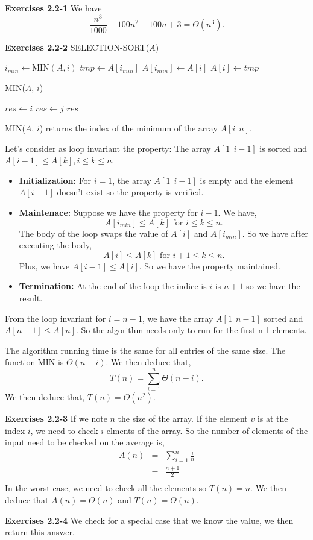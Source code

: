 \documentclass[a4paper,12pt]{article}
\newcommand{\newpar}[1]
{\bigskip \noindent \textbf{Exercises #1} \newline}
\newcommand{\la}{\leftarrow}
\begin{document}
\newpar{2.2-1}
We have
\[ \frac{n^3}{1000} - 100 n^2 - 100 n + 3 = \Theta(n^3).\]

\newpar{2.2-2}
SELECTION-SORT($A$)
\begin{algorithmic}
\FOR {$i \la 1$ to $length[A]$}
	\STATE $i_{min} \la \mathrm{MIN}(A, i)$
	\STATE $tmp \la A[i_{min}]$
	\STATE $A[i_{min}] \la A[i]$
	\STATE $A[i] \la tmp$
\ENDFOR
\end{algorithmic}

\smallskip \noindent
MIN($A$, $i$)
\begin{algorithmic}
\STATE $res \la i$
\FOR {$j \la i+1$ to $length[A]$}
		\STATE $res \la j$
	\ENDIF
\ENDFOR
\RETURN $res$
\end{algorithmic}

MIN($A$, $i$) returns the index of the minimum of the array
$A[i\ \ n]$.

Let's consider as loop invariant the property: The array $A[1\ \ i-1]$
is sorted and $ A[i-1] \le A[k], i\le k\le n$.
\begin{itemize}
\item
\textbf{Initialization: }For $i=1$, the array $A[1\ \ i-1]$ is empty
and the element $A[i-1]$ doesn't exist so the property is verified.

\item
\textbf{Maintenace: }Suppose we have the property for $i-1$.  We have,
\[ A[i_{min}] \le A[k] \mbox{ for } i\le k\le n.\]
The body of the loop swaps the value of $A[i]$ and $A[i_{min}]$. So we
have after executing the body,
\[ A[i] \le A[k] \mbox{ for } i+1\le k\le n.\]
Plus, we have $A[i-1] \le A[i]$.  So we have the property maintained.

\item
\textbf{Termination: } At the end of the loop the indice is $i$ is
$n+1$ so we have the result.
\end{itemize}

From the loop invariant for $i=n-1$, we have the array $A[1\ \ n-1]$
sorted and $A[n-1] \le A[n]$.  So the algorithm needs only to run for
the first n-1 elements.

The algorithm running time is the same for all entries of the same
size.  The function \textrm{MIN} is $\Theta(n-i)$.  We then deduce
that,
\[ T(n) = \sum_{i=1}^n\Theta(n-i).\]
We then deduce that, $T(n) = \Theta(n^2)$.

\newpar{2.2-3} If we note $n$ the size of the array.  If the element
$v$ is at the index $i$, we need to check $i$ elments of the array.  So
the number of elements of the input need to be checked on the average
is,
\begin{eqnarray*}
A(n) &=& \sum_{i=1}^n \frac{i}{n}\\
&=&\frac{n+1}{2}\\
\end{eqnarray*}
In the worst case, we need to check all the elements so $T(n) = n$.
We then deduce that $A(n) = \Theta(n)$ and $T(n) = \Theta(n)$.

\newpar{2.2-4}
We check for a special case that we know the value,  we then return this answer.
\end{document}
